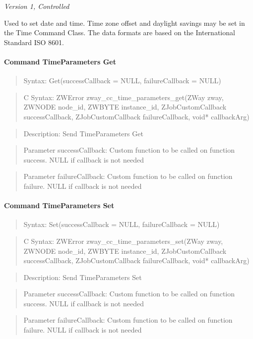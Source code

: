 \textit{Version 1, Controlled}
\newline

Used to set date and time. Time zone offset and daylight savings may be set in the Time Command Class. The data formats are based on the International Standard ISO 8601.
\paragraph{Command TimeParameters Get}
\begin{quote}Syntax: Get(successCallback = NULL, failureCallback = NULL)\end{quote}
\begin{quote}C Syntax: ZWError zway\_cc\_time\_parameters\_get(ZWay zway, ZWNODE node\_id, ZWBYTE instance\_id, ZJobCustomCallback successCallback, ZJobCustomCallback failureCallback, void* callbackArg)\end{quote}
\begin{quote}Description: Send TimeParameters Get\end{quote}
\begin{quote}Parameter successCallback: Custom function to be called on function success. NULL if callback is not needed\end{quote}
\begin{quote}Parameter failureCallback: Custom function to be called on function failure. NULL if callback is not needed\end{quote}


\paragraph{Command TimeParameters Set}
\begin{quote}Syntax: Set(successCallback = NULL, failureCallback = NULL)\end{quote}
\begin{quote}C Syntax: ZWError zway\_cc\_time\_parameters\_set(ZWay zway, ZWNODE node\_id, ZWBYTE instance\_id, ZJobCustomCallback successCallback, ZJobCustomCallback failureCallback, void* callbackArg)\end{quote}
\begin{quote}Description: Send TimeParameters Set\end{quote}
\begin{quote}Parameter successCallback: Custom function to be called on function success. NULL if callback is not needed\end{quote}
\begin{quote}Parameter failureCallback: Custom function to be called on function failure. NULL if callback is not needed\end{quote}



